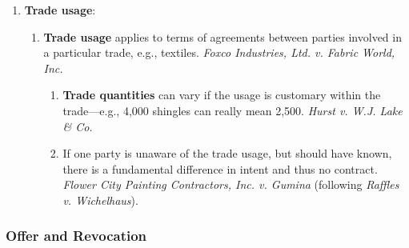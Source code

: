 \begin{enumerate}
\begin{enumerate}
{        circumstances''} into account to honor the parties' intent. 
        \emph{Spaulding v. Morse}. Others disagree. \emph{Lawson v. Martin 
        Timber Co.}
        \item Some amount of interpretation is always necessary---e.g., 
        ``fetch some soupmeat.''\footnote{Casebook p. 405.}
    \end{enumerate}
    \item \textbf{Trade usage}:
    \begin{enumerate}
        \item \textbf{Trade usage} applies to terms of agreements between 
        parties involved in a particular trade, e.g., textiles. \emph{Foxco 
        Industries, Ltd. v. Fabric World, Inc.}
        \begin{enumerate}
            \item \textbf{Trade quantities} can vary if the usage is customary 
            within the trade---e.g., 4,000 shingles can really mean 2,500.  
            \emph{Hurst v.  W.J. Lake \& Co.}
            \item If one party is unaware of the trade usage, but should have 
            known, there is a fundamental difference in intent and thus no 
            contract. \emph{Flower City Painting Contractors, Inc. v. Gumina} 
            (following \emph{Raffles v. Wichelhaus}).
        \end{enumerate}
    \end{enumerate}
\end{enumerate}

\subsubsection{Offer and Revocation}


